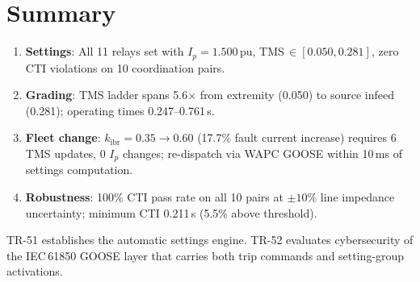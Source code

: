 \documentclass[11pt,a4paper]{article}
\begin{document}
\section{Summary}
\label{sec:summary}

\begin{enumerate}
  \item \textbf{Settings}: All 11 relays set with $I_p=1.500$\,pu,
    TMS\,$\in[0.050, 0.281]$, zero CTI violations on 10 coordination pairs.

  \item \textbf{Grading}: TMS ladder spans 5.6$\times$ from extremity (0.050)
    to source infeed (0.281); operating times 0.247--0.761\,s.

  \item \textbf{Fleet change}: $k_\mathrm{ibr}=0.35\to0.60$ (17.7\%
    fault current increase) requires 6 TMS updates, 0 $I_p$ changes;
    re-dispatch via WAPC GOOSE within 10\,ms of settings computation.

  \item \textbf{Robustness}: 100\% CTI pass rate on all 10 pairs at
    $\pm10\%$ line impedance uncertainty; minimum CTI 0.211\,s
    (5.5\% above threshold).
\end{enumerate}

\noindent
TR-51 establishes the automatic settings engine.  TR-52 evaluates
cybersecurity of the IEC\,61850 GOOSE layer that carries both trip
commands and setting-group activations.



\end{document}
